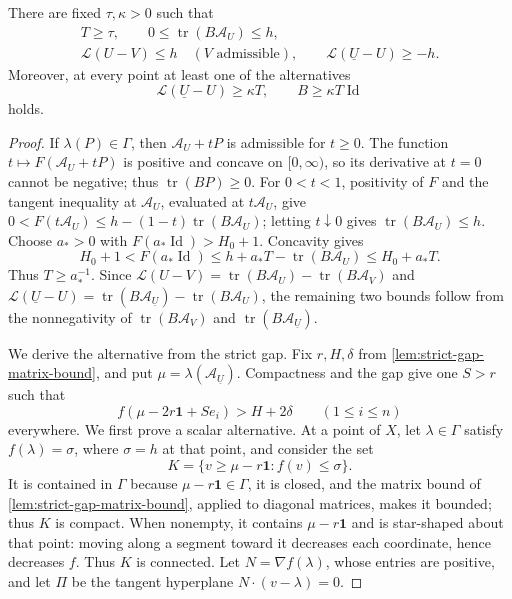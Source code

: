 \begin{lemma}\label{lem:concave-linearized-alternative}
There are fixed $\tau,\kappa>0$ such that
\begin{gather*}
 T\geq\tau,\qquad 0\leq\operatorname{tr}(B\mathcal A_U)\leq h,\\
 \mathcal L(U-V)\leq h\quad(V\text{ admissible}),\qquad
 \mathcal L(\underline U-U)\geq-h.
\end{gather*}
Moreover, at every point at least one of the alternatives
\[
 \mathcal L(\underline U-U)\geq\kappa T,
 \qquad B\geq\kappa T\operatorname{Id}
\]
holds.
\end{lemma}
\begin{proof}
If $\lambda(P)\in\Gamma$, then $\mathcal A_U+tP$ is admissible for $t\geq0$. The function $t\mapsto F(\mathcal A_U+tP)$ is positive and concave on $[0,\infty)$, so its derivative at $t=0$ cannot be negative; thus $\operatorname{tr}(BP)\geq0$. For $0<t<1$, positivity of $F$ and the tangent inequality at $\mathcal A_U$, evaluated at $t\mathcal A_U$, give $0<F(t\mathcal A_U)\leq h-(1-t)\operatorname{tr}(B\mathcal A_U)$; letting $t\downarrow0$ gives $\operatorname{tr}(B\mathcal A_U)\leq h$. Choose $a_*>0$ with $F(a_*\operatorname{Id})>H_0+1$. Concavity gives
\[
 H_0+1<F(a_*\operatorname{Id})
 \leq h+a_*T-\operatorname{tr}(B\mathcal A_U)\leq H_0+a_*T.
\]
Thus $T\geq a_*^{-1}$. Since $\mathcal L(U-V)=\operatorname{tr}(B\mathcal A_U)-\operatorname{tr}(B\mathcal A_V)$ and $\mathcal L(\underline U-U)=\operatorname{tr}(B\mathcal A_{\underline U})-\operatorname{tr}(B\mathcal A_U)$, the remaining two bounds follow from the nonnegativity of $\operatorname{tr}(B\mathcal A_V)$ and $\operatorname{tr}(B\mathcal A_{\underline U})$.

We derive the alternative from the strict gap. Fix $r,H,\delta$ from \cref{lem:strict-gap-matrix-bound}, and put $\mu=\lambda(\mathcal A_{\underline U})$. Compactness and the gap give one $S>r$ such that
\[
 f(\mu-2r\mathbf1+Se_i)>H+2\delta\qquad(1\leq i\leq n)
\]
everywhere. We first prove a scalar alternative. At a point of $X$, let $\lambda\in\Gamma$ satisfy $f(\lambda)=\sigma$, where $\sigma=h$ at that point, and consider the set
\[
 K=\{v\geq\mu-r\mathbf1:f(v)\leq\sigma\}.
\]
It is contained in $\Gamma$ because $\mu-r\mathbf1\in\Gamma$, it is closed, and the matrix bound of \cref{lem:strict-gap-matrix-bound}, applied to diagonal matrices, makes it bounded; thus $K$ is compact. When nonempty, it contains $\mu-r\mathbf1$ and is star-shaped about that point: moving along a segment toward it decreases each coordinate, hence decreases $f$. Thus $K$ is connected. Let $N=\nabla f(\lambda)$, whose entries are positive, and let $\Pi$ be the tangent hyperplane $N\cdot(v-\lambda)=0$.


\end{proof}
